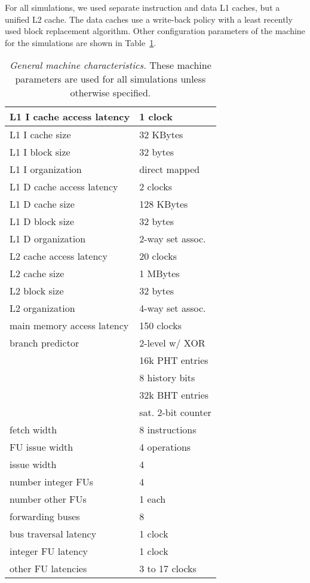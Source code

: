 \documentclass[10pt,dvips]{article}
\begin{document}
For all simulations, we used separate instruction and
data L1 caches, but a unified L2 cache.
The data caches use a write-back policy with a least recently used
block replacement algorithm.
Other configuration parameters of the machine for the
simulations are shown in Table~\ref{tab:baseline}.

%
\begin{table}
\begin{center}
\caption{{\em General machine characteristics.}
\small{
These machine parameters are used for all simulations
unless otherwise specified.
}
}
\label{tab:baseline}
\scriptsize{
\begin{tabular}{|l|l|}
\hline 
L1 I cache access latency&1 clock\\
\hline
L1 I cache size&32 KBytes\\
\hline
L1 I block size&32 bytes\\
\hline
L1 I organization&direct mapped\\
%
\hline 
L1 D cache access latency&2 clocks\\
\hline
L1 D cache size&128 KBytes\\
\hline
L1 D block size&32 bytes\\
\hline
L1 D organization&2-way set assoc.\\
%
\hline
L2 cache access latency&20 clocks\\
\hline
L2 cache size&1 MBytes\\
\hline
L2 block size&32 bytes\\
\hline
L2 organization&4-way set assoc.\\
%
\hline
main memory access latency&150 clocks\\
\hline
branch predictor&2-level w/ XOR\\
\cline{2-2}
 & 16k PHT entries\\
\cline{2-2}
 & 8 history bits\\
\cline{2-2}
 & 32k BHT entries\\
\cline{2-2}
 & sat. 2-bit counter\\
\hline
fetch width & 8 instructions \\
\hline
FU issue width & 4 operations \\
\hline
issue width & 4 \\
\hline
number integer FUs & 4 \\
\hline
number other FUs & 1 each \\
\hline
forwarding buses & 8 \\
\hline
bus traversal latency & 1 clock \\
\hline
integer FU latency & 1 clock \\
\hline
other FU latencies & 3 to 17 clocks \\
\hline 
\end{tabular}
}
\end{center}
\end{table}
%
\end{document}
